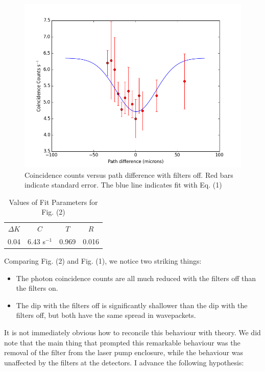\documentclass[10pt,a4paper]{article}
\begin{document}
\begin{figure}[H]
\centering
\includegraphics[scale=0.5]{../Analysis/figure_2.png}
\caption{Coincidence counts versus path difference with filters off. Red bars indicate standard error. The blue line indicates fit with Eq. (1)}
\end{figure}
\begin{table}[H]
\centering
\begin{tabular}{|c|c|c|c|}
\hline
$\Delta K$ & $C$ & $T$ & $R$\\
0.04 & 6.43 s$^{-1}$ & 0.969 & 0.016\\
\hline
\end{tabular}
\caption{Values of Fit Parameters for Fig. (2)}
\end{table}
\noindent Comparing Fig. (2) and Fig. (1), we notice two striking things:
\begin{itemize}
\item The photon coincidence counts are all much reduced with the filters off than the filters on.
\item The dip with the filters off is significantly shallower than the dip with the filters off, but both have the same spread in wavepackets.
\end{itemize}
It is not immediately obvious how to reconcile this behaviour with theory. We did note that the main thing that prompted this remarkable behaviour was the removal of the filter from the laser pump enclosure, while the behaviour was unaffected by the filters at the detectors. I advance the following hypothesis:
\end{document}
